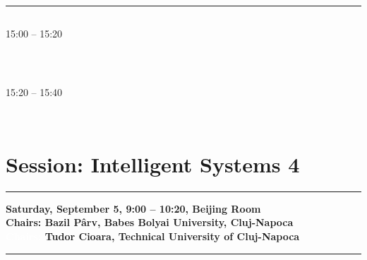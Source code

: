            
            \\ 
            \noindent\rule{\textwidth}{0.4pt}
\vspace*{-36pt}\subsection[ 
    	   {\bf Skill-Oriented Priority Scheduling for Solving the Resource Constrained Project Scheduling Problem
           } \\
           {\it Aurelia Ciupe, Bogdan Orza, Camelia Florea, Aurel Vlaicu
           }
	]
	    {
            }
	    15:00 -- 15:20 \nopagebreak
	    
            
            \\ 
\vspace*{-36pt}\subsection[ 
     	   {\bf Movie Recommender System Using the User's Psychological Profile
           } \\
           {\it Costin-Gabriel Chiru, Vladimir-Nicolae Dinu, Catalina Preda, Matei Macri
           }
	]
	    {
            }
	    15:20 -- 15:40 \nopagebreak
	    
            
            \\ 


\section{{\bf \large Session: 
Intelligent Systems 4
}}\vspace{-15pt}%
\noindent\rule{\textwidth}{0.4pt} \nopagebreak
{\bf  
Saturday, September 5, 9:00 -- 10:20, Beijing Room
} \\ \nopagebreak
{\bf  Chairs: 
Bazil P\^{a}rv, Babes Bolyai University, Cluj-Napoca
} \\ \nopagebreak
{\bf  \textcolor{white}{Chairs:} 
Tudor Cioara, Technical University of Cluj-Napoca
} \\ \nopagebreak
\noindent\rule{\textwidth}{0.4pt}\nopagebreak

